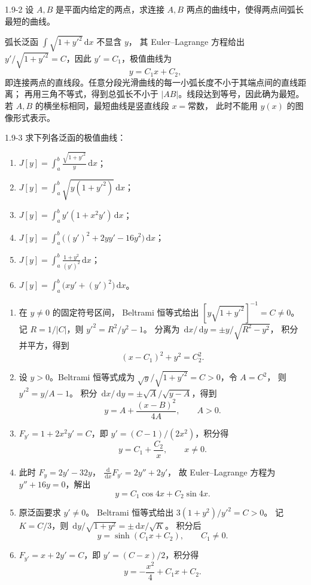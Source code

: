 \documentclass[UTF8,a4paper,11pt]{ctexart}
\newcommand{\dd}{\,\mathrm d}
\begin{document}
\begin{problem}{1.9-2}
设 $A,B$ 是平面内给定的两点，求连接 $A,B$ 两点的曲线中，使得两点间弧长最短的曲线。
\end{problem}

\begin{solution}
弧长泛函 $\int\sqrt{1+y'^2}\dd x$ 不显含 $y$，
其 Euler--Lagrange 方程给出
$y'/\sqrt{1+y'^2}=C$，因此 $y'=C_1$，极值曲线为
\[
\boxed{y=C_1x+C_2},
\]
即连接两点的直线段。任意分段光滑曲线的每一小弧长度不小于其端点间的直线距离；
再用三角不等式，得到总弧长不小于 $|AB|$。线段达到等号，因此确为最短。
若 $A,B$ 的横坐标相同，最短曲线是竖直线段 $x=\text{常数}$，
此时不能用 $y(x)$ 的图像形式表示。
\end{solution}

\begin{problem}{1.9-3}
求下列各泛函的极值曲线：
  \begin{enumerate}[label=(\arabic*)]
    \item $\displaystyle J[y]=\int_a^b\frac{\sqrt{1+y'^2}}{y}\dd x$；
    \item $\displaystyle J[y]=\int_a^b\sqrt{y(1+y'^2)}\dd x$；
    \item $\displaystyle J[y]=\int_a^b y'(1+x^2y')\dd x$；
    \item $\displaystyle J[y]=\int_a^b\bigl((y')^2+2yy'-16y^2\bigr)\dd x$；
    \item $\displaystyle J[y]=\int_a^b\frac{1+y^2}{(y')^2}\dd x$；
    \item $\displaystyle J[y]=\int_a^b\bigl(xy'+(y')^2\bigr)\dd x$。
  \end{enumerate}
\end{problem}

\begin{solution}
\begin{enumerate}[label=(\arabic*)]
\item 在 $y\ne0$ 的固定符号区间，
Beltrami 恒等式给出 $[y\sqrt{1+y'^2}]^{-1}=C\ne0$。
记 $R=1/|C|$，则 $y'^2=R^2/y^2-1$。
分离为 $\dd x/\dd y=\pm y/\sqrt{R^2-y^2}$，
积分并平方，得到
\[
\boxed{(x-C_1)^2+y^2=C_2^2}.
\]
\item 设 $y>0$。Beltrami 恒等式成为
$\sqrt y/\sqrt{1+y'^2}=C>0$，令 $A=C^2$，
则 $y'^2=y/A-1$。
积分 $\dd x/\dd y=\pm\sqrt A/\sqrt{y-A}$，得到
\[
\boxed{y=A+\frac{(x-B)^2}{4A}},\qquad A>0.
\]
\item $F_{y'}=1+2x^2y'=C$，即
$y'=(C-1)/(2x^2)$，积分得
\[
\boxed{y=C_1+\frac{C_2}{x}},\qquad x\ne0.
\]
\item 此时 $F_y=2y'-32y$，
$\frac{\dd}{\dd x}F_{y'}=2y''+2y'$，
故 Euler--Lagrange 方程为 $y''+16y=0$，解出
\[
\boxed{y=C_1\cos4x+C_2\sin4x}.
\]
\item 原泛函要求 $y'\ne0$。
Beltrami 恒等式给出 $3(1+y^2)/y'^2=C>0$。
记 $K=C/3$，则 $\dd y/\sqrt{1+y^2}=\pm\dd x/\sqrt K$。
积分后
\[
\boxed{y=\sinh(C_1x+C_2)},\qquad C_1\ne0.
\]
\item $F_{y'}=x+2y'=C$，即 $y'=(C-x)/2$，积分得
\[
\boxed{y=-\frac{x^2}{4}+C_1x+C_2}.
\]
\end{enumerate}
\end{solution}
\end{document}
